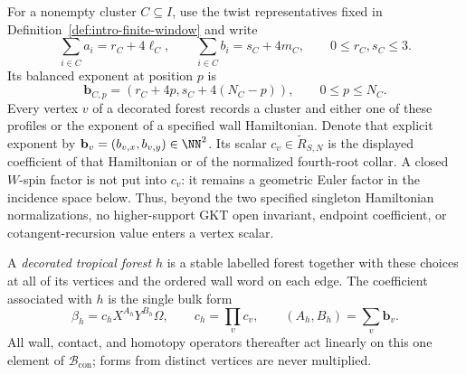 For a nonempty cluster $C\subseteq I$, use the twist representatives fixed
in Definition~\ref{def:intro-finite-window} and write
\begin{equation}
 \sum_{i\in C}a_i=r_C+4\ell_C,\qquad
 \sum_{i\in C}b_i=s_C+4m_C,\qquad 0\leq r_C,s_C\leq3.
 \label{eq:des-cluster-residues}
\end{equation}
Its balanced exponent at position $p$ is
\begin{equation}
 \mathbf b_{C,p}=(r_C+4p,s_C+4(N_C-p)),\qquad 0\leq p\leq N_C.
 \label{eq:des-cluster-profile}
\end{equation}
Every vertex $v$ of a decorated forest records a cluster and either one of
these profiles or the exponent of a specified wall Hamiltonian.  Denote that
explicit exponent by
$\mathbf b_v=(b_{v,x},b_{v,y})\in\NN^2$.  Its scalar
$c_v\in\widetilde R_{S,N}$ is the displayed coefficient of that Hamiltonian
or of the normalized fourth-root collar.  A closed $W$-spin factor is not
put into $c_v$: it remains a geometric Euler factor in the incidence space
below.  Thus, beyond the two specified singleton Hamiltonian normalizations,
no higher-support GKT open invariant, endpoint coefficient, or
cotangent-recursion value enters a vertex scalar.

A \emph{decorated tropical forest} $h$ is a stable labelled forest together with
these choices at all of its vertices and the ordered wall word on each edge.
The coefficient associated with $h$ is the single bulk form
\begin{equation}
 \beta_h=c_hX^{A_h}Y^{B_h}\Omega,\qquad
 c_h=\prod_vc_v,\qquad
 (A_h,B_h)=\sum_v\mathbf b_v.
 \label{eq:des-single-seed}
\end{equation}
All wall, contact, and homotopy operators thereafter act linearly on this
one element of $\mathcal B_{\mathrm{con}}$; forms from distinct vertices are
never multiplied.

